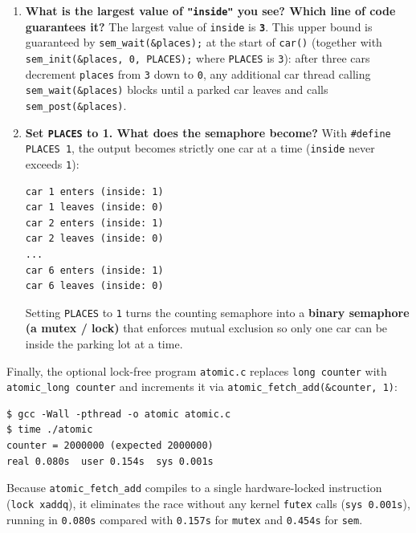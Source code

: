 \documentclass{../latex/utmreport}
\providecommand{\tightlist}{\setlength{\itemsep}{0pt}\setlength{\parskip}{0pt}}
\begin{document}
\begin{enumerate}
\tightlist
\item \textbf{What is the largest value of \texttt{"inside"} you see? Which line of code guarantees it?}
The largest value of \texttt{inside} is \textbf{\texttt{3}}. This upper bound is guaranteed by \texttt{sem\_wait(\&places);} at the start of \texttt{car()} (together with \texttt{sem\_init(\&places, 0, PLACES);} where \texttt{PLACES} is \texttt{3}): after three cars decrement \texttt{places} from \texttt{3} down to \texttt{0}, any additional car thread calling \texttt{sem\_wait(\&places)} blocks until a parked car leaves and calls \texttt{sem\_post(\&places)}.

\item \textbf{Set \texttt{PLACES} to 1. What does the semaphore become?}
With \texttt{\#define PLACES 1}, the output becomes strictly one car at a time (\texttt{inside} never exceeds \texttt{1}):
\begin{lstlisting}
car 1 enters (inside: 1)
car 1 leaves (inside: 0)
car 2 enters (inside: 1)
car 2 leaves (inside: 0)
...
car 6 enters (inside: 1)
car 6 leaves (inside: 0)
\end{lstlisting}
Setting \texttt{PLACES} to \texttt{1} turns the counting semaphore into a \textbf{binary semaphore (a mutex / lock)} that enforces mutual exclusion so only one car can be inside the parking lot at a time.
\end{enumerate}

Finally, the optional lock-free program \texttt{atomic.c} replaces \texttt{long counter} with \texttt{atomic\_long counter} and increments it via \texttt{atomic\_fetch\_add(\&counter, 1)}:

\begin{lstlisting}
$ gcc -Wall -pthread -o atomic atomic.c
$ time ./atomic
counter = 2000000 (expected 2000000)
real 0.080s  user 0.154s  sys 0.001s
\end{lstlisting}

Because \texttt{atomic\_fetch\_add} compiles to a single hardware-locked instruction (\texttt{lock xaddq}), it eliminates the race without any kernel \texttt{futex} calls (\texttt{sys 0.001s}), running in \texttt{0.080s} compared with \texttt{0.157s} for \texttt{mutex} and \texttt{0.454s} for \texttt{sem}.

\utmconclusions
\end{document}
